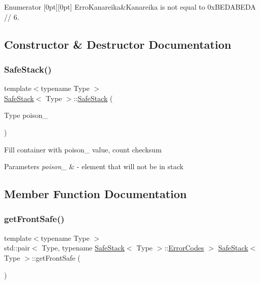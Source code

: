 \begin{DoxyEnumFields}{Enumerator}
[0pt][0pt]{}\mbox{\label{classSafeStack_a3a6ee072918bd0a2c09fa0ea12c1ab64a4b7d6f3ca4bc8af6d813a8e9b97f1592}} 
Erro\+Kanareika&Kanareika is not equal to 0x\+B\+E\+D\+A\+B\+E\+DA // 6. \\
\hline

\end{DoxyEnumFields}


\subsection{Constructor \& Destructor Documentation}
\mbox{\label{classSafeStack_a09eef1ed7a4e2b0486d4991bc23ea78f}} 
\subsubsection{\texorpdfstring{Safe\+Stack()}{SafeStack()}}
{\footnotesize\ttfamily template$<$typename Type $>$ \\
\hyperlink{classSafeStack}{Safe\+Stack}$<$ Type $>$\+::\hyperlink{classSafeStack}{Safe\+Stack} (\begin{DoxyParamCaption}\item[{Type}]{poison\+\_\+ }\end{DoxyParamCaption})}

Fill container with poison\+\_\+ value, count checksum 
\begin{DoxyParams}{Parameters}
{\em poison\+\_\+} & -\/ element that will not be in stack \\
\hline
\end{DoxyParams}


\subsection{Member Function Documentation}
\mbox{\label{classSafeStack_a5b4c56ff55c462bd746f4f36258d46e0}} 
\subsubsection{\texorpdfstring{get\+Front\+Safe()}{getFrontSafe()}}
{\footnotesize\ttfamily template$<$typename Type $>$ \\
std\+::pair$<$ Type, typename \hyperlink{classSafeStack}{Safe\+Stack}$<$ Type $>$\+::\hyperlink{classSafeStack_a3a6ee072918bd0a2c09fa0ea12c1ab64}{Error\+Codes} $>$ \hyperlink{classSafeStack}{Safe\+Stack}$<$ Type $>$\+::get\+Front\+Safe (\begin{DoxyParamCaption}{ }\end{DoxyParamCaption})}

